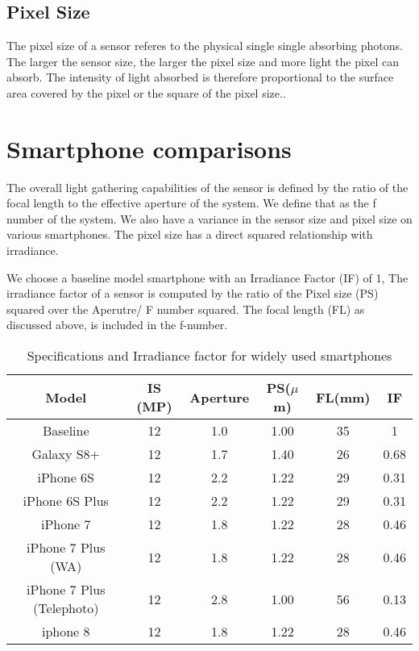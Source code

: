 \documentclass{article}
\begin{document}
\subsection{Pixel Size}

The pixel size of a sensor referes to the physical single single absorbing photons. The
larger the sensor size, the larger the pixel size and more light the pixel can absorb. The
intensity of light absorbed is therefore proportional to the surface area covered by the pixel
or the square of the pixel size..
\section{Smartphone comparisons}
The overall light gathering capabilities of the sensor is defined by the ratio of the focal length
to the effective aperture of the system. We define that as the f number of the system.
We also have a variance in the sensor size and pixel size on various smartphones. The
pixel size has a direct squared relationship with irradiance.

We choose a baseline model smartphone with an Irradiance Factor (IF) of 1,
The irradiance factor of a sensor is computed by the ratio of the Pixel size (PS) squared over
the Aperutre/ F number squared. The focal length (FL) as discussed above, is included in the f-number.

\begin{table}[h!]
\centering
\begin{tabular}{||c c c c c c||}
 \hline
 Model & IS (MP) & Aperture & PS($\mu$m) & FL(mm) & IF\\ [0.5ex]
 \hline\hline
 Baseline                  & 12 &1.0& 1.00 & 35 &1 \\
 Galaxy S8+                & 12 &1.7& 1.40 & 26 &0.68\\
 iPhone 6S                 & 12 &2.2& 1.22 & 29 &0.31\\
 iPhone 6S Plus            & 12 &2.2& 1.22 & 29 &0.31\\
 iPhone 7                  & 12 &1.8& 1.22 & 28 &0.46\\
 iPhone 7 Plus (WA)        & 12 &1.8& 1.22 & 28 &0.46\\
 iPhone 7 Plus (Telephoto) & 12 &2.8& 1.00 & 56 &0.13\\
 iphone 8                  & 12 &1.8& 1.22 & 28 &0.46\\[1ex]
 \hline
\end{tabular}
\caption{Specifications and Irradiance factor for widely used smartphones}
\label{table:1}
\end{table}
\end{document}
